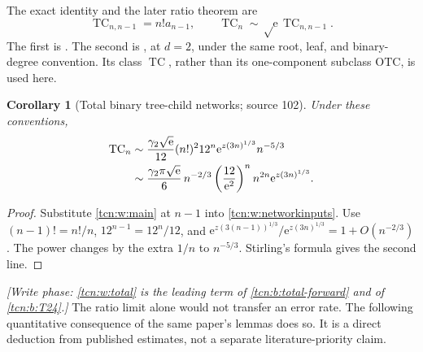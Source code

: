 \documentclass[11pt,letterpaper]{article}
\newcommand{\ee}{\mathrm e}
\newcommand{\TC}{\operatorname{TC}}
\newtheorem{corollary}[theorem]{Corollary}
\theoremstyle{remark}
\begin{document}
The exact identity and the later ratio theorem are
\begin{equation}\label{tcn:w:networkinputs}
 \TC_{n,n-1}=n!a_{n-1},\qquad
 \TC_n\sim\sqrt\ee\,\TC_{n,n-1}.
\end{equation}
The first is \cite[Proposition 2]{FYZ2021}. The second is \cite[Corollary 1.11(i)]{Chang2024}, at $d=2$, under the same root, leaf, and binary-degree convention. Its class $\TC$, rather than its one-component subclass $\mathrm{OTC}$, is used here.
\begin{corollary}[Total binary tree-child networks; source 102]\label{tcn:w:cor:network}
Under these conventions,
\begin{align}
 \TC_n&\sim\frac{\gamma_2\sqrt\ee}{12}(n!)^2 12^n
       \ee^{z(3n)^{1/3}}n^{-5/3}\label{tcn:w:total}\\
 &\sim\frac{\gamma_2\pi\sqrt\ee}{6}\,n^{-2/3}
       \left(\frac{12}{\ee^2}\right)^n n^{2n}\ee^{z(3n)^{1/3}}.\notag
\end{align}
\end{corollary}
\begin{proof}
Substitute \eqref{tcn:w:main} at $n-1$ into \eqref{tcn:w:networkinputs}. Use $(n-1)!=n!/n$, $12^{n-1}=12^n/12$, and
$\ee^{z(3(n-1))^{1/3}}/\ee^{z(3n)^{1/3}}=1+O(n^{-2/3})$.
The power changes by the extra $1/n$ to $n^{-5/3}$. Stirling's formula gives the second line.
\end{proof}
\emph{[Write phase: \eqref{tcn:w:total} is the leading term of \eqref{tcn:b:total-forward} and of \eqref{tcn:b:T24}.]} The ratio limit alone would not transfer an error rate. The following quantitative consequence of the same paper's lemmas does so. It is a direct deduction from published estimates, not a separate literature-priority claim.
\end{document}
